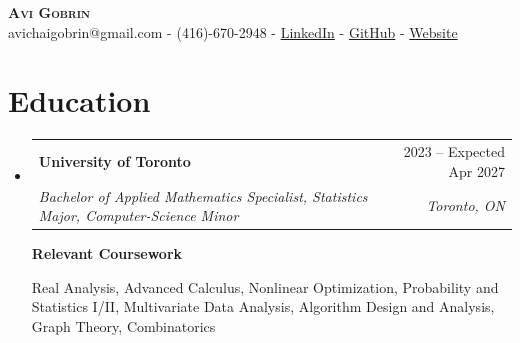 \documentclass[letterpaper,11pt]{article}
\makeatletter
\newcommand{\resumeSubheading}[4]{
  \vspace{-2pt}\item
    \begin{tabular*}{0.97\textwidth}[t]{l@{\extracolsep{\fill}}r}
      \textbf{#1} & #2 \\
      \textit{\small#3} & \textit{\small #4} \\
    \end{tabular*}\vspace{-5pt}
}
\newcommand{\resumeSubHeadingListStart}{\begin{itemize}[leftmargin=0.15in, label={}]}
\newcommand{\resumeSubHeadingListEnd}{\end{itemize}}
\makeatother
\begin{document}
\begin{center}
    \textbf{\Huge \scshape Avi Gobrin} \\ \vspace{4pt}
    \small avichaigobrin@gmail.com - (416)-670-2948 - \href{https://www.linkedin.com/in/avigobrin/}{\color{blue} LinkedIn} - \href{https://github.com/Avi-Gobrin}{\color{blue} GitHub} - \href{https://avi-gobrin.github.io/personal-site/}{\color{blue} Website} \vspace{-4pt}
\end{center}
\section{Education}
  \resumeSubHeadingListStart
    \resumeSubheading
      {University of Toronto}{2023 -- Expected Apr 2027}
      {Bachelor of Applied Mathematics Specialist, Statistics Major, Computer-Science Minor}{Toronto, ON}
      \vspace{4pt}

    {\bf Relevant Coursework}
\vspace{-7pt}
{\small\setlength{\topsep}{0pt}\setlength{\parskip}{0pt}
\begin{flushleft}
Real Analysis, Advanced Calculus, Nonlinear Optimization, Probability and Statistics I/II, Multivariate Data Analysis, Algorithm Design and Analysis, Graph Theory, Combinatorics
\end{flushleft}}
  \resumeSubHeadingListEnd
\vspace{-15pt}
\end{document}
